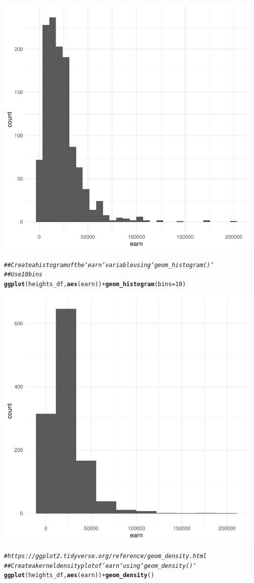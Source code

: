 \documentclass{article}\usepackage[]{graphicx}\usepackage[]{xcolor}
\makeatletter
\newcommand{\hlnum}[1]{\textcolor[rgb]{0.686,0.059,0.569}{#1}}%
\newcommand{\hlcom}[1]{\textcolor[rgb]{0.678,0.584,0.686}{\textit{#1}}}%
\newcommand{\hlopt}[1]{\textcolor[rgb]{0,0,0}{#1}}%
\newcommand{\hlstd}[1]{\textcolor[rgb]{0.345,0.345,0.345}{#1}}%
\newcommand{\hlkwc}[1]{\textcolor[rgb]{0.333,0.667,0.333}{#1}}%
\newcommand{\hlkwd}[1]{\textcolor[rgb]{0.737,0.353,0.396}{\textbf{#1}}}%
\newenvironment{kframe}{%
 \def\at@end@of@kframe{}%
 \ifinner\ifhmode%
  \def\at@end@of@kframe{\end{minipage}}%
  \begin{minipage}{\columnwidth}%
 \fi\fi%
 \def\FrameCommand##1{\hskip\@totalleftmargin \hskip-\fboxsep
 \colorbox{shadecolor}{##1}\hskip-\fboxsep
     \hskip-\linewidth \hskip-\@totalleftmargin \hskip\columnwidth}%
 \MakeFramed {\advance\hsize-\width
   \@totalleftmargin\z@ \linewidth\hsize
   \@setminipage}}%
 {\par\unskip\endMakeFramed%
 \at@end@of@kframe}
\newenvironment{knitrout}{}{} %
\makeatother
\begin{document}
\begin{knitrout}
{\centering \includegraphics[width=.6\linewidth]{figure/assignment-03-TangXin-Rnwauto-report-9} 

}


\begin{kframe}\begin{alltt}
\hlcom{## Create a histogram of the `earn` variable using `geom_histogram()`}
\hlcom{## Use 10 bins}
\hlkwd{ggplot}\hlstd{(heights_df,} \hlkwd{aes}\hlstd{(earn))} \hlopt{+} \hlkwd{geom_histogram}\hlstd{(}\hlkwc{bins} \hlstd{=} \hlnum{10}\hlstd{)}
\end{alltt}
\end{kframe}

{\centering \includegraphics[width=.6\linewidth]{figure/assignment-03-TangXin-Rnwauto-report-10} 

}


\begin{kframe}\begin{alltt}
\hlcom{# https://ggplot2.tidyverse.org/reference/geom_density.html}
\hlcom{## Create a kernel density plot of `earn` using `geom_density()`}
\hlkwd{ggplot}\hlstd{(heights_df,} \hlkwd{aes}\hlstd{(earn))} \hlopt{+} \hlkwd{geom_density}\hlstd{()}
\end{alltt}
\end{kframe}


\end{knitrout}
\end{document}
